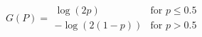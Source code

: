 

\[
G(P) = \begin{array}{ll} \log(2p) & \mbox{for $p \le 0.5$} \\ -\log(2(1 - p)) & \mbox{for $p > 0.5$} \end{array}
\]



